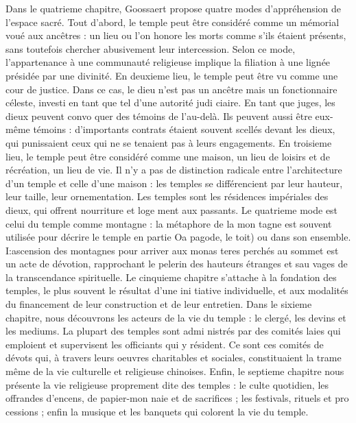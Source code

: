 Dans le quatrieme chapitre, Goossaert propose quatre modes d'appréhension de l'espace sacré. Tout d'abord, le temple peut être considéré comme un mémorial voué aux ancêtres : un lieu ou l'on honore les morts comme s'ils étaient présents, sans toutefois chercher abusivement leur intercession. Selon ce mode, l'appartenance à une communauté religieuse implique la filiation à une lignée présidée par une divinité. En deuxieme lieu, le temple peut être vu comme une cour de justice. Dans ce cas, le dieu n'est pas un ancêtre mais un fonctionnaire céleste, investi en tant que tel d'une autorité judi  ciaire. En tant que juges, les dieux peuvent convo  quer des témoins de l'au-delà. Ils peuvent aussi être eux-même témoins : d'importants contrats étaient souvent scellés devant les dieux, qui punissaient ceux qui ne se tenaient pas à leurs engagements. En troisieme lieu, le temple peut être considéré comme une maison, un lieu de loisirs et de récréation, un lieu de vie. Il n'y a pas de distinction radicale entre l'architecture d'un temple et celle d'une maison : les temples se différencient par leur hauteur, leur taille, leur ornementation. Les temples sont les résidences impériales des dieux, qui offrent nourriture et loge  ment aux passants. Le quatrieme mode est celui du temple comme montagne : la métaphore de la mon  tagne est souvent utilisée pour décrire le temple en partie Oa pagode, le toit) ou dans son ensemble. I:ascension des montagnes pour arriver aux monas  teres perchés au sommet est un acte de dévotion, rapprochant le pelerin des hauteurs étranges et sau  vages de la transcendance spirituelle.
Le cinquieme chapitre s'attache à la fondation
des temples, le plus souvent le résultat d'une ini  tiative individuelle, et aux modalités du financement de leur construction et de leur entretien.
Dans le sixieme chapitre, nous découvrons les acteurs de la vie du temple : le clergé, les devins et les mediums. La plupart des temples sont admi  nistrés par des comités laies qui emploient et supervisent les officiants qui y résident. Ce sont ces comités de dévots qui, à travers leurs oeuvres charitables et sociales, constituaient la trame même de la vie culturelle et religieuse chinoises. Enfin, le septieme chapitre nous présente la vie religieuse proprement dite des temples : le culte quotidien, les offrandes d'encens, de papier-mon  naie et de sacrifices ; les festivals, rituels et pro  cessions ; enfin la musique et les banquets qui colorent la vie du temple.
